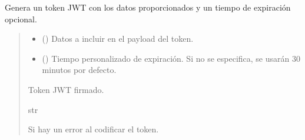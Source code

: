 \documentclass[letterpaper,10pt,spanish]{sphinxmanual}
\begin{document}
\begin{fulllineitems}
\label{\detokenize{endpoints:main.crear_token}}
\pysigstartsignatures
\pysiglinewithargsret
{}
{\sphinxparamcomma {}}
{}
\pysigstopsignatures
\sphinxAtStartPar
Genera un token JWT con los datos proporcionados y un tiempo de expiración opcional.
\begin{quote}\begin{description}
\begin{itemize}
\item {} 
\sphinxAtStartPar
{} () \textendash{} Datos a incluir en el payload del token.

\item {} 
\sphinxAtStartPar
{} (\sphinxstyleliteralemphasis{\sphinxupquote{{[}}}\sphinxstyleliteralemphasis{\sphinxupquote{{]}}}) \textendash{} Tiempo personalizado de expiración. Si no se especifica, se usarán 30 minutos por defecto.

\end{itemize}

\sphinxAtStartPar
Token JWT firmado.

\sphinxAtStartPar
str

\sphinxAtStartPar
{} \textendash{} Si hay un error al codificar el token.

\end{description}\end{quote}

\end{fulllineitems}

\end{document}
